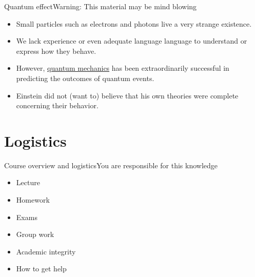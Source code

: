 \begin{frame}{Quantum effect}{Warning:  This material may be mind blowing}
\begin{itemize}
    \item Small particles such as electrons and photons live a very strange existence.
    \item We lack experience or even adequate language language to understand or express how they behave.
    \item However, \href{https://en.wikipedia.org/wiki/Quantum_mechanics}{quantum mechanics} has been extraordinarily successful in predicting the outcomes of quantum events.
    \item Einstein did not (want to) believe that his own theories were complete concerning their behavior.
\end{itemize}


\end{frame}

\section{Logistics}

\begin{frame}{Course overview and logistics}{You are responsible for this knowledge}
\begin{itemize}
    \item Lecture
    \item Homework
    \item Exams
    \item Group work
    \item Academic integrity
    \item How to get help
\end{itemize}
\end{frame}
